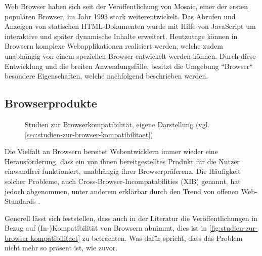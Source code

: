 Web Browser haben sich seit der Veröffentlichung von Mosaic, einer der ersten populären Browser, im Jahr 1993 stark weiterentwickelt. Das Abrufen und Anzeigen von statischen HTML-Dokumenten wurde mit Hilfe von JavaScript um interaktive und später dynamische Inhalte erweitert. Heutzutage können in Browsern komplexe Webapplikationen realisiert werden, welche zudem unabhängig von einem speziellen Browser entwickelt werden können. Durch diese Entwicklung und die breiten Anwendungsfälle, besitzt die Umgebung ``Browser`` besondere Eigenschaften, welche nachfolgend beschrieben werden.

\subsection{Browserprodukte}
\label{sec:browserprodukte}

\begin{wrapfigure}[19]{r}{0.45\textwidth}
\centering
{}
\caption{Studien zur Browserkompatibilität, eigene Darstellung (vgl. \ref{sec:studien-zur-browser-kompatibilitaet})}
\label{fig:studien-zur-browser-kompatibilitaet}
\end{wrapfigure}

Die Vielfalt an Browsern bereitet Webentwicklern immer wieder eine Herausforderung, dass ein von ihnen bereitgestelltes Produkt für die Nutzer einwandfrei funktioniert, unabhängig ihrer Browserpräferenz. Die Häufigkeit solcher Probleme, auch Cross-Browser-Incompatabilities (XIB) genannt, hat jedoch abgenommen, unter anderem erklärbar durch den Trend von offenen Web-Standards \cite{W3CStandards}.

Generell lässt sich feststellen, dass auch in der Literatur die Veröffentlichungen in Bezug auf (In-)Kompatibilität von Browsern abnimmt, dies ist in \autoref{fig:studien-zur-browser-kompatibilitaet} zu betrachten. Was dafür spricht, dass das Problem nicht mehr so präsent ist, wie zuvor.

